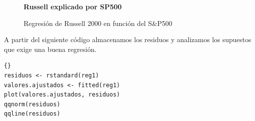 \begin{figure}[h]
	\centering
	\textbf{Russell explicado por SP500}\par\medskip
	\caption{Regresión de Russell 2000 en función del S\&P500}
\end{figure}



\pagebreak A partir del siguiente c\'odigo almacenamos los residuos y analizamos los supuestos que exige una buena regresi\'on.
\begin{lstlisting}[title={‘Código R para Residuos de regresión’},basicstyle=\ttfamily]{}
residuos <- rstandard(reg1)
valores.ajustados <- fitted(reg1)
plot(valores.ajustados, residuos)
qqnorm(residuos)
qqline(residuos)
\end{lstlisting}\label{ejemplo3ResiduosRegresion}



